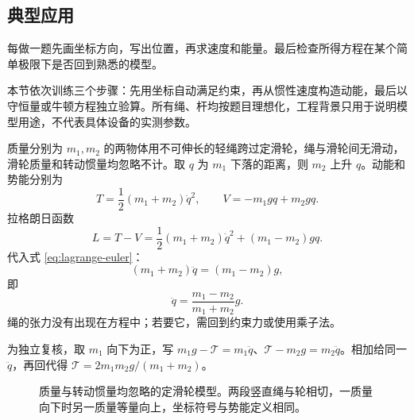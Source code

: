 \subsection{典型应用}

每做一题先画坐标方向，写出位置，再求速度和能量。最后检查所得方程在某个简单极限下是否回到熟悉的模型。

本节依次训练三个步骤：先用坐标自动满足约束，再从惯性速度构造动能，最后以守恒量或牛顿方程独立验算。所有绳、杆均按题目理想化，工程背景只用于说明模型用途，不代表具体设备的实测参数。

\begin{example}[阿特伍德机]
质量分别为 $m_1,m_2$ 的两物体用不可伸长的轻绳跨过定滑轮，绳与滑轮间无滑动，滑轮质量和转动惯量均忽略不计。取 $q$ 为 $m_1$ 下落的距离，则 $m_2$ 上升 $q$。动能和势能分别为
\[
T=\frac12(m_1+m_2)\dot q^2,
\qquad
V=-m_1gq+m_2gq.
\]
拉格朗日函数
\[
L=T-V=\frac12(m_1+m_2)\dot q^2+(m_1-m_2)gq.
\]
代入式 \eqref{eq:lagrange-euler}：
\[
(m_1+m_2)\ddot q=(m_1-m_2)g,
\]
即
\[
\ddot q=\frac{m_1-m_2}{m_1+m_2}g.
\]
绳的张力没有出现在方程中；若要它，需回到约束力或使用乘子法。

为独立复核，取 $m_1$ 向下为正，写 $m_1g-\mathcal T=m_1\ddot q$、$\mathcal T-m_2g=m_2\ddot q$。相加给同一 $\ddot q$，再回代得 $\mathcal T=2m_1m_2g/(m_1+m_2)$。
\end{example}

\begin{figure}[htbp]
\centering
{}
\caption{质量与转动惯量均忽略的定滑轮模型。两段竖直绳与轮相切，一质量向下时另一质量等量向上，坐标符号与势能定义相同。}
\label{fig:atwood}
\end{figure}

